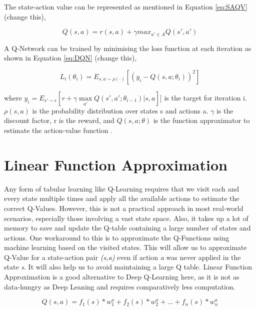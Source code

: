 \documentclass[logo,msc]{infthesis}           %
\begin{document}
 The state-action value can be represented as mentioned in Equation \ref{eq:SAQV} (change this),

\begin{equation}
Q(s,a) = r(s,a) + {\gamma} max_{a'\in A} Q(s',a')
\label{eq:SAQV}
\end{equation}
 
 A Q-Network can be trained by minimising the loss function at each iteration as shown in Equation \ref{eq:DQN} (change this),

\begin{equation} L_{i}(\theta _{i}) = E_{s,a\sim\rho(\cdot)}[(y_{i} - Q(s,a;\theta _{i}))^2]
\label{eq:DQN}
\end{equation}

where \(y_{i} = E_{s'\sim\epsilon}[r+\gamma\max\limits_{{a'}}Q(s', a'; \theta_{i-1})|s, a]]\) is the target for iteration i. \(\rho(s,a)\) is the probability distribution over states s and actions a. \(\gamma\) is the discount factor, r is the reward, and \(Q(s,a;\theta)\) is the function approximator to estimate the action-value function \cite{DBLP:journals/corr/MnihKSGAWR13}.

\section{Linear Function Approximation}

Any form of tabular learning like Q-Learning requires that we visit each and every state multiple times and apply all the available actions to estimate the correct Q-Values. However, this is not a practical approach in most real-world scenarios, especially those involving a vast state space. Also, it takes up a lot of memory to save and update the Q-table containing a large number of states and actions. One workaround to this is to approximate the Q-Functions using machine learning based on the visited states. This will allow us to approximate Q-Value for a state-action pair \textit{(s,a)} even if action \textit{a} was never applied in the state \textit{s}. It will also help us to avoid maintaining a large Q table. Linear Function Approximation \cite{P2} is a good alternative to Deep Q-Learning here, as it is not as data-hungry as Deep Leaning and requires comparatively less computation.

\begin{equation}
Q(s,a) = f_1(s) * w_1^a + f_2(s) * w_2^a + ... + f_n(s) * w_n^a 
\label{eq:Q_Approx}
\end{equation}
\end{document}
